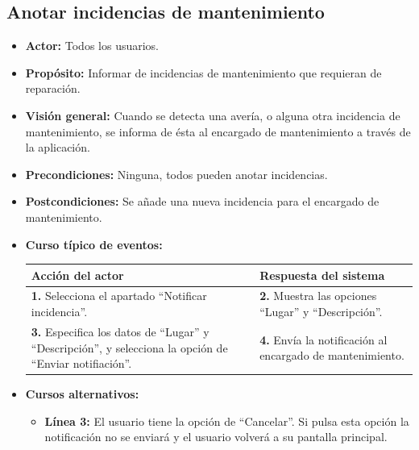 \documentclass[spanish,a4paper,11pt, twoside]{report}	%
\begin{document}

		\subsection{Anotar incidencias de mantenimiento}	
			\begin{itemize}
				\item \textbf{Actor:} Todos los usuarios.
				\item \textbf{Propósito:} Informar de incidencias de mantenimiento que requieran de reparación. 		
				\item \textbf{Visión general:} Cuando se detecta una avería, o alguna otra
					incidencia de mantenimiento, se informa de ésta al encargado de mantenimiento a
					través de la aplicación.
				\item \textbf{Precondiciones:} Ninguna, todos pueden anotar incidencias.
				\item \textbf{Postcondiciones:}  Se añade una nueva incidencia para el encargado de mantenimiento.
				\item \textbf{Curso típico de eventos:}\\ 
				\begin{tabular}{|p{6cm}||p{6cm}|}
					\hline
					\textbf{Acción del actor} & \textbf{Respuesta del sistema} \\ \hline \hline
					\textbf{1.} Selecciona el apartado ``Notificar incidencia''. & 
					\textbf{2.} Muestra las opciones ``Lugar'' y ``Descripción''.\\ \hline 
					\textbf{3.} Especifica los datos de ``Lugar'' y ``Descripción'', 
						y selecciona la opción de ``Enviar notifiación''. & 
					\textbf{4.} Envía la notificación al encargado de mantenimiento.\\ \hline
					
				\end{tabular}
				\item \textbf{Cursos alternativos:} 
					\begin{itemize}
						\item \textbf{Línea 3: }El usuario tiene la opción de ``Cancelar''. 
						Si pulsa esta opción la notificación no se enviará y el usuario volverá a su pantalla principal.
					\end{itemize}
			\end {itemize}

		\hspace{0.5 true cm}
\end{document}

